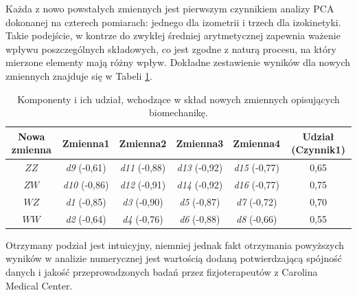Każda z nowo powstałych zmiennych jest pierwszym czynnikiem analizy PCA dokonanej na czterech pomiarach: jednego dla izometrii i trzech dla izokinetyki. Takie podejście, w kontrze do zwykłej średniej arytmetycznej zapewnia ważenie wpływu poszczególnych składowych, co jest zgodne z naturą procesu, na który mierzone elementy mają różny wpływ. Dokładne zestawienie wyników dla nowych zmiennych znajduje się w Tabeli \ref{tab:bio-new-factors}.
\vspace{20px}
\begin{table}[h!]
	\centering
	\setlength{\tabcolsep}{3pt}
	\setlength\extrarowheight{2pt}
	\caption{Komponenty i ich udział, wchodzące w skład nowych zmiennych opisujących biomechanikę.}
	\label{tab:bio-new-factors}
	\begin{tabular}{c|c|c|c|c||c}
		Nowa zmienna&Zmienna1&Zmienna2&Zmienna3&Zmienna4&Udział (Czynnik1) \\
		\hline \hline
		$ZZ$&\textit{d9} (-0,61)&\textit{d11} (-0,88)&\textit{d13} (-0,92)&\textit{d15} (-0,77)&0,65\\
		\hline
		$ZW$&\textit{d10} (-0,86)&\textit{d12} (-0,91)&\textit{d14} (-0,92)&\textit{d16} (-0,77)&0,75\\
		\hline
		$WZ$&\textit{d1} (-0,85)&\textit{d3} (-0,90)&\textit{d5} (-0,87)&\textit{d7} (-0,72)&0,70\\
		\hline
		$WW$&\textit{d2} (-0,64)&\textit{d4} (-0,76)&\textit{d6} (-0,88)&\textit{d8} (-0,66)&0,55\\
		
		
	\end{tabular}
\end{table}

Otrzymany podział jest intuicyjny, niemniej jednak fakt otrzymania powyższych wyników w analizie numerycznej jest wartością dodaną potwierdzającą spójność danych i jakość przeprowadzonych badań przez fizjoterapeutów z Carolina Medical Center.  

